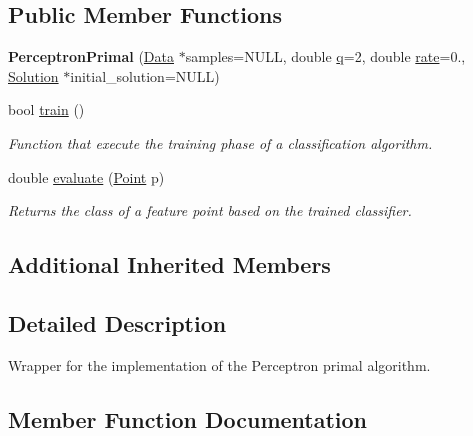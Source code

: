 \subsection*{Public Member Functions}
\begin{DoxyCompactItemize}
\item 
\mbox{\label{class_perceptron_primal_a3c182ca6be41096ac89aebcb45761660}} 
{\bfseries Perceptron\+Primal} (\hyperlink{class_data}{Data} $\ast$samples=N\+U\+LL, double \hyperlink{class_primal_classifier_a746ad2ff93fb77d82ae389f90dbdc89e}{q}=2, double \hyperlink{class_classifier_af9867e5919742de1303dd971a9a1c19a}{rate}=0., \hyperlink{class_solution}{Solution} $\ast$initial\+\_\+solution=N\+U\+LL)
\item 
bool \hyperlink{class_perceptron_primal_a17f817a72fc7d61d1686ea77f7f9e84d}{train} ()
\begin{DoxyCompactList}\small\item\em Function that execute the training phase of a classification algorithm. \end{DoxyCompactList}\item 
double \hyperlink{class_perceptron_primal_ac8ce9ceffe2b35b5386e5367fb419b3b}{evaluate} (\hyperlink{class_point}{Point} p)
\begin{DoxyCompactList}\small\item\em Returns the class of a feature point based on the trained classifier. \end{DoxyCompactList}\end{DoxyCompactItemize}
\subsection*{Additional Inherited Members}


\subsection{Detailed Description}
Wrapper for the implementation of the Perceptron primal algorithm. 

\subsection{Member Function Documentation}
\mbox{\label{class_perceptron_primal_ac8ce9ceffe2b35b5386e5367fb419b3b}} 
